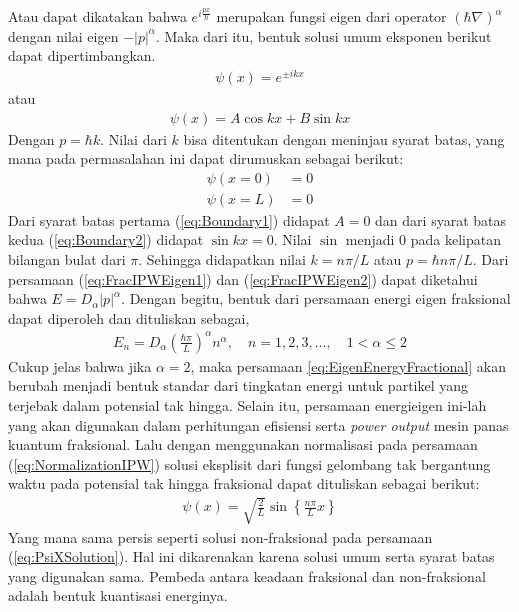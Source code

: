 Atau dapat dikatakan bahwa \(e^{i\frac{px}{\hbar}}\) merupakan fungsi eigen dari operator \((\hbar\nabla)^\alpha\) dengan nilai eigen \(-|p|^\alpha\). Maka dari itu, bentuk solusi umum eksponen berikut dapat dipertimbangkan. 
\begin{align}
    \psi(x) = e^{\pm ikx} 
\end{align}
atau
\begin{align}
    \psi(x) = A\cos{kx} + B\sin{kx}
\end{align}
Dengan \(p=\hbar k\). Nilai dari \(k\) bisa ditentukan dengan meninjau syarat batas, yang mana pada permasalahan ini dapat dirumuskan sebagai berikut:
\begin{align}
    \psi(x=0) &= 0 \label{eq:Boundary1} \\
    \psi(x=L) &= 0 \label{eq:Boundary2}
\end{align}
Dari syarat batas pertama (\ref{eq:Boundary1}) didapat \(A=0\) dan dari syarat batas kedua (\ref{eq:Boundary2}) didapat \(\sin{kx}=0\). Nilai \(\sin\) menjadi 0 pada kelipatan bilangan bulat dari \(\pi\). Sehingga didapatkan nilai \(k = n\pi/L\) atau \(p = \hbar n\pi/L\). Dari persamaan (\ref{eq:FracIPWEigen1}) dan (\ref{eq:FracIPWEigen2}) dapat diketahui bahwa \(E=D_\alpha |p|^\alpha\). Dengan begitu, bentuk dari persamaan energi eigen fraksional dapat diperoleh dan dituliskan sebagai,
\begin{align}
    E_n = D_\alpha\left(\frac{\hbar\pi}{L}\right)^\alpha n^\alpha, \quad n = 1,2,3,..., \quad 1<\alpha\leq 2 \label{eq:EigenEnergyFractional}
\end{align}
Cukup jelas bahwa jika \(\alpha = 2\), maka persamaan \ref{eq:EigenEnergyFractional} akan berubah menjadi bentuk standar dari tingkatan energi untuk partikel yang terjebak dalam potensial tak hingga. Selain itu, persamaan energieigen ini-lah yang akan digunakan dalam perhitungan efisiensi serta \textit{power output} mesin panas kuantum fraksional. Lalu dengan menggunakan normalisasi pada persamaan (\ref{eq:NormalizationIPW}) solusi eksplisit dari fungsi gelombang tak bergantung waktu pada potensial tak hingga fraksional dapat dituliskan sebagai berikut:
\begin{align}
    \psi(x) = \sqrt{\frac{2}{L}}\sin{\left\{\frac{n\pi}{L}x\right\}}
\end{align}
Yang mana sama persis seperti solusi non-fraksional pada persamaan (\ref{eq:PsiXSolution}). Hal ini dikarenakan karena solusi umum serta syarat batas yang digunakan sama. Pembeda antara keadaan fraksional dan non-fraksional adalah bentuk kuantisasi energinya. \cite{Guo2006Some}
